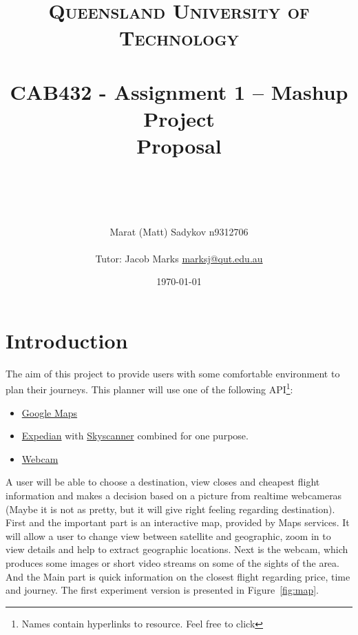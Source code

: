 \documentclass[12pt]{article}
\title{	
	\normalfont \normalsize 
	\textsc{Queensland University of Technology} \\ [25pt] 
	\horrule{0.5pt} \\[0.4cm] %
	\huge CAB432 - Assignment 1 – Mashup Project \\ Proposal \\ %
	\author{ Marat (Matt) Sadykov \small n9312706 \\ \\ Tutor: Jacob Marks \small \underline{marksj@qut.edu.au}}
	\date{\normalsize\today} %
	\horrule{2pt} \\[0.5cm] %
}
\numberwithin{equation}{section} %
\numberwithin{figure}{section} %
\numberwithin{table}{section} %
\begin{document}
\maketitle
\newpage
\newpage
\section{Introduction}	

	The aim of this project to provide users with some comfortable environment to plan their journeys. This planner will use one of the following API\footnote{Names contain hyperlinks to resource. Feel free to click}: 
	
	\begin{itemize}
		\item \href{https://developers.google.com/maps/documentation/}{Google Maps}
		\item \href{https://hackathon.expedia.com/docs/public/api/Flights Overview/}{Expedian} with \href{https://partners.skyscanner.net/affiliates/travel-apis/}{Skyscanner} combined for one purpose.
		\item \href{https://developers.webcams.travel/\#webcams/list}{Webcam}
	\end{itemize}	
	A user will be able to choose a destination, view closes and cheapest flight information and makes a decision based on a picture from realtime webcameras (Maybe it is not as pretty, but it will give right feeling regarding destination). First and the important part is an interactive map, provided by Maps services. It will allow a user to change view between satellite and geographic, zoom in to view details and help to extract geographic locations. Next is the webcam, which produces some images or short video streams on some of the sights of the area. And the Main part is quick information on the closest flight regarding price, time and journey. The first experiment version is presented in Figure~\ref{fig:map}.	
\end{document}
